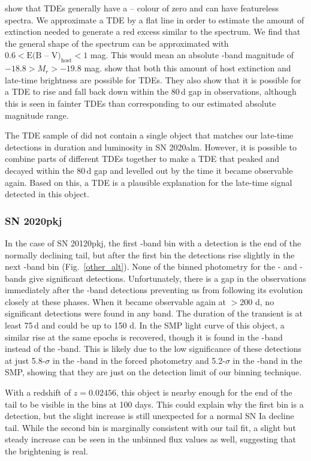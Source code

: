 \documentclass[a4paper,oneside,12pt, class=Latex/Classes/PhDthesisPSnPDF, crop=false]{standalone}
\begin{document}
\citet{TDE_host_ext_range} show that TDEs generally have a \ztfg -- \ztfr colour of zero and can have featureless spectra. We approximate a TDE by a flat line in order to estimate the amount of extinction needed to generate a red excess similar to the spectrum. We find that the general shape of the spectrum can be approximated with $0.6 < \text{E(B -- V)}_\text{host} < 1$ mag. This would mean an absolute \ztfr-band magnitude of $-18.8 > M_r > -19.8$ mag. \citet{TDE_host_ext_range} show that both this amount of host extinction and late-time brightness are possible for TDEs. They also show that it is possible for a TDE to rise and fall back down within the 80\,d gap in observations, although this is seen in fainter TDEs than corresponding to our estimated absolute magnitude range.

The TDE sample of \citet{TDE_host_ext_range} did not contain a single object that matches our late-time detections in duration and luminosity in SN 2020alm. However, it is possible to combine parts of different TDEs together to make a TDE that peaked and decayed within the 80\,d gap and levelled out by the time it became observable again. Based on this, a TDE is a plausible explanation for the late-time signal detected in this object.


\subsubsection*{SN 2020pkj}
In the case of SN 20120pkj, the first \ztfr-band bin with a detection is the end of the normally declining tail, but after the first bin the detections rise slightly in the next \ztfr-band bin (Fig.~\ref{other_alt}). None of the binned photometry for the \ztfg- and \ztfi-bands give significant detections. Unfortunately, there is a gap in the observations immediately after the \ztfr-band detections preventing us from following its evolution closely at these phases. When it became observable again at $>$200 d, no significant detections were found in any band. The duration of the transient is at least 75\,d and could be up to 150 d. In the SMP light curve of this object, a similar rise at the same epochs is recovered, though it is found in the \ztfg-band instead of the \ztfr-band. This is likely due to the low significance of these detections at just 5.8-$\sigma$ in the \ztfr-band in the forced photometry and 5.2-$\sigma$ in the \ztfg-band in the SMP, showing that they are just on the detection limit of our binning technique.

With a redshift of $z = 0.02456$, this object is nearby enough for the end of the tail to be visible in the bins at 100 days. This could explain why the first bin is a detection, but the slight increase is still unexpected for a normal SN Ia decline tail. While the second bin is marginally consistent with our tail fit, a slight but steady increase can be seen in the unbinned flux values as well, suggesting that the brightening is real.
\end{document}
